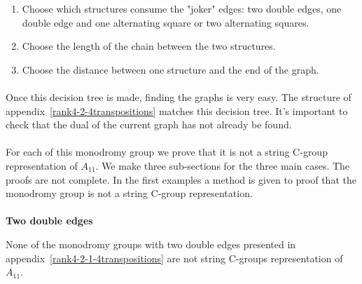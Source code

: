 \begin{enumerate}
  \item Choose which structures consume the "joker" edges: two double edges, one double edge and one alternating square or two alternating squares.
  \item Choose the length of the chain between the two structures.
  \item Choose the distance between one structure and the end of the graph.
\end{enumerate}

\paragraph{}
Once this decision tree is made, finding the graphs is very easy. The structure of appendix~\ref{rank4-2-4transpositions} matches this decision tree. It's important to check that the dual of the current graph has not already be found.

\paragraph{}
For each of this monodromy group we prove that it is not a string C-group representation of $A_{11}$. We make three sub-sections for the three main cases. The proofs are not complete. In the first examples a method is given to proof that the monodromy group is not a string C-group representation.


\paragraph{}
\textbf{Two double edges}

\begin{lemma}
  \label{proof-2-2}
  None of the monodromy groups with two double edges presented in appendix~\ref{rank4-2-1-4transpositions} are not string C-groups representation of $A_{11}$.
\end{lemma}

